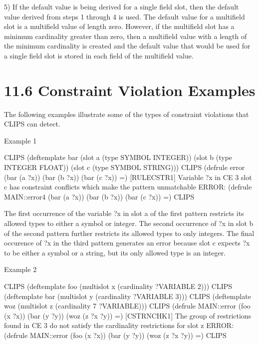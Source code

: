 \documentclass[letterpaper,10pt,english]{sphinxmanual}
\begin{document}
5) If the default value is being derived for a single field slot, then
the default value derived from steps 1 through 4 is used. The default
value for a multifield slot is a multifield value of length zero.
However, if the multifield slot has a minimum cardinality greater than
zero, then a multifield value with a length of the minimum cardinality
is created and the default value that would be used for a single field
slot is stored in each field of the multifield value.


\section{11.6 Constraint Violation Examples}
\label{\detokenize{constraints:constraint-violation-examples}}
The following examples illustrate some of the types of constraint
violations that CLIPS can detect.

Example 1

\begin{sphinxVerbatim}[commandchars=\\\{\}]
CLIPS\PYGZgt{}
(deftemplate bar
(slot a (type SYMBOL INTEGER))
(slot b (type INTEGER FLOAT))
(slot c (type SYMBOL STRING)))
CLIPS\PYGZgt{}
(defrule error
(bar (a ?x))
(bar (b ?x))
(bar (c ?x))
=\PYGZgt{})
[RULECSTR1] Variable ?x in CE \PYGZsh{}3 slot c
has constraint conflicts which make the pattern unmatchable
ERROR:
(defrule MAIN::error\PYGZhy{}4
(bar (a ?x))
(bar (b ?x))
(bar (c ?x))
=\PYGZgt{})
CLIPS\PYGZgt{}
\end{sphinxVerbatim}

The first occurrence of the variable ?x in slot a of the first pattern
restricts its allowed types to either a symbol or integer. The second
occurrence of ?x in slot b of the second pattern further restricts its
allowed types to only integers. The final occurence of ?x in the third
pattern generates an error because slot c expects ?x to be either a
symbol or a string, but its only allowed type is an integer.

Example 2

\begin{sphinxVerbatim}[commandchars=\\\{\}]
CLIPS\PYGZgt{}
(deftemplate foo (multislot x (cardinality ?VARIABLE 2)))
CLIPS\PYGZgt{}
(deftemplate bar (multislot y (cardinality ?VARIABLE 3)))
CLIPS\PYGZgt{}
(deftemplate woz (multislot z (cardinality 7 ?VARIABLE)))
CLIPS\PYGZgt{}
(defrule MAIN::error
(foo (x \PYGZdl{}?x))
(bar (y \PYGZdl{}?y))
(woz (z \PYGZdl{}?x \PYGZdl{}?y))
=\PYGZgt{})
[CSTRNCHK1] The group of restrictions found in CE \PYGZsh{}3
do not satisfy the cardinality restrictions for slot z
ERROR:
(defrule MAIN::error
(foo (x \PYGZdl{}?x))
(bar (y \PYGZdl{}?y))
(woz (z \PYGZdl{}?x \PYGZdl{}?y))
=\PYGZgt{})
CLIPS\PYGZgt{}
\end{sphinxVerbatim}
\end{document}
